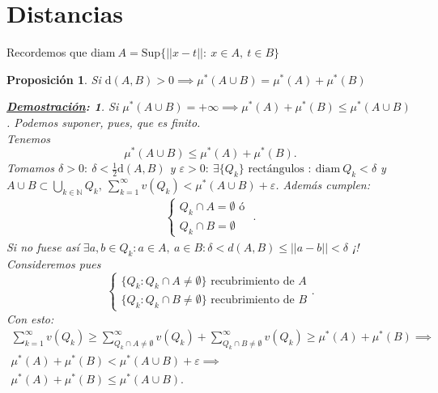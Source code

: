 \documentclass[10pt,a4paper,openright]{book}
\theoremstyle{break}
\newtheorem*{prop}{Proposición}
\newtheorem*{demo}{\underline{Demostración}:}
\begin{document}
\section*{Distancias}%
\label{sec:distancias}
Recordemos que $ \mathrm{diam}\ A = \mathrm{Sup}\{\vert \vert x - t \vert  \vert: \ x \in A, \ t \in B \} $

\begin{prop}
    Si $\mathrm{d}\left( A, B \right) > 0 \implies \mu^*\left( A \cup B \right) = \mu^*\left( A \right) + \mu^*\left( B \right)$
    \begin{demo}
        Si $ \mu^*\left( A\cup B \right) = +\infty \implies \mu^*\left( A \right) + \mu^*\left( B \right) \le  \mu^*\left( A\cup B \right)$. Podemos suponer, pues, que es finito.\\
        Tenemos \[
            \mu^*\left( A\cup B \right) \le  \mu^*\left( A \right) + \mu^*\left( B \right)
        .\] 
        Tomamos $\delta > 0: \ \delta < \frac{1}{2}\mathrm{d}\left( A, B \right)$ y 
        $\varepsilon > 0: \ \exists \{Q_k\} \text{ rectángulos }: \ \mathrm{diam}\ Q_k < \delta$ y 
        $A\cup B \subset \bigcup_{k \in \mathbb{N}} Q_k, \ \sum_{k=1}^{\infty} v\left( Q_k \right) < \mu^*\left( A\cup B \right) + \varepsilon $. Además cumplen: 
        \begin{gather*}
            \begin{cases}
                Q_k \cap A = \emptyset \text{ ó }\\
                Q_k \cap B = \emptyset
            \end{cases}
        .\end{gather*}
        Si no fuese así $\exists a, b \in Q_k: a \in A,\ a \in B: \delta < d\left( A, B \right) \le \vert \vert a - b \vert  \vert < \delta $ ¡!\\
        Consideremos pues \[
        \begin{cases}
            \{Q_k : Q_k \cap A \neq \emptyset\} \text{ recubrimiento de } A \\
            \{Q_k : Q_k \cap B \neq \emptyset\} \text{ recubrimiento de } B
        \end{cases}
        .\] 
        Con esto:
        \begin{gather*}
            \sum_{k=1}^{\infty} v\left( Q_k \right) \ge \sum_{Q_k\cap A \neq \emptyset}^{\infty} v\left( Q_k \right) + \sum_{Q_k\cap B \neq \emptyset}^{\infty} v\left( Q_k \right) \ge \mu^*\left( A \right) + \mu^*\left( B \right) \implies\\
            \mu^*\left( A \right) + \mu^*\left( B \right) < \mu^*\left( A\cup B \right) + \varepsilon \implies \\
            \mu^*\left( A \right) + \mu^*\left( B \right) \le \mu^*\left( A\cup B \right)
        .\end{gather*}
    \end{demo}
\end{prop}
\end{document}
